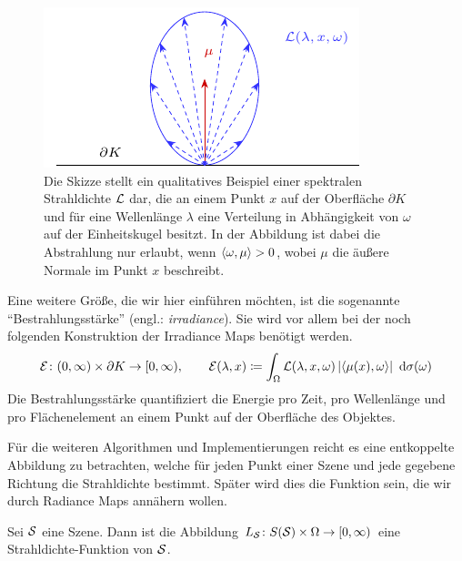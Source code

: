		\begin{figure}[h]
			\center
			\includegraphics{gg_fig/radiance_1.pdf}
			\caption{Die Skizze stellt ein qualitatives Beispiel einer spektralen Strahldichte $\mathcal{L}$ dar, die an einem Punkt $x$ auf der Oberfläche $\partial K$ und für eine Wellenlänge $\lambda$ eine Verteilung in Abhängigkeit von $\omega$ auf der Einheitskugel besitzt. In der Abbildung ist dabei die Abstrahlung nur erlaubt, wenn $\left\langle \omega,\mu \right\rangle>0$, wobei $\mu$ die äußere Normale im Punkt $x$ beschreibt.}
			\label{fig:radiance}
		\end{figure}

		Eine weitere Größe, die wir hier einführen möchten, ist die sogenannte \enquote{Bestrahlungsstärke} (engl.: \textit{irradiance}).
		Sie wird vor allem bei der noch folgenden Konstruktion der Irradiance Maps benötigt werden.
		\[
			\mathcal{E}\colon(0,\infty)\times\partial K\to[0,\infty),\qquad \mathcal{E}(\lambda,x) \coloneqq \int_{\Omega}^{}  \mathcal{L}(\lambda,x,\omega)\left\vert \left\langle \mu(x),\omega \right\rangle \right\vert \ \mathrm{d} \sigma(\omega)
		\]
		Die Bestrahlungsstärke quantifiziert die Energie pro Zeit, pro Wellenlänge und pro Flächenelement an einem Punkt auf der Oberfläche des Objektes.

		Für die weiteren Algorithmen und Implementierungen reicht es eine entkoppelte Abbildung zu betrachten, welche für jeden Punkt einer Szene und jede gegebene Richtung die Strahldichte bestimmt.
		Später wird dies die Funktion sein, die wir durch Radiance Maps annähern wollen.
		\begin{definition}
			Sei $\mathcal{S}$ eine Szene.
			Dann ist die Abbildung $L_{\mathcal{S}}\colon S(\mathcal{S})\times \Omega\to[0,\infty)$ eine Strahldichte-Funktion von $\mathcal{S}$.
		\end{definition}



